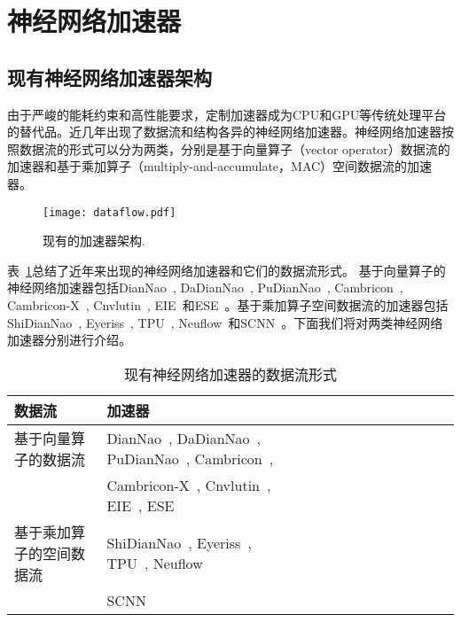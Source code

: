 \section{神经网络加速器}


\subsection{现有神经网络加速器架构}
由于严峻的能耗约束和高性能要求，定制加速器成为CPU和GPU等传统处理平台的替代品。近几年出现了数据流和结构各异的神经网络加速器。神经网络加速器按照数据流的形式可以分为两类，分别是基于向量算子（vector operator）数据流的加速器和基于乘加算子（multiply-and-accumulate，MAC）空间数据流的加速器。
\begin{figure}[h]
  \centering
  \texttt{[image: dataflow.pdf]}
  \caption{\footnotesize 现有的加速器架构.}
  \label{fig:dataflow}
\end{figure}

表~\ref{tab:dataflow}总结了近年来出现的神经网络加速器和它们的数据流形式。
基于向量算子的神经网络加速器包括DianNao~\cite{chen2014diannao}, DaDianNao~\cite{chen2014dadiannao}, PuDianNao~\cite{liu2015pudiannao}, Cambricon~\cite{liu2016cambricon}, Cambricon-X~\cite{zhang2016cambricon}, Cnvlutin~\cite{albericio2016cnvlutin}, EIE~\cite{han2016eie}和ESE~\cite{han2017ese}。基于乘加算子空间数据流的加速器包括ShiDianNao~\cite{du2015shidiannao}, Eyeriss~\cite{chen2017eyeriss}, TPU~\cite{jouppi2017tpu}, Neuflow~\cite{farabet2011neuflow}和SCNN~\cite{angshuman2017scnn}。下面我们将对两类神经网络加速器分别进行介绍。

\begin{table}[h]
  \footnotesize
  \centering
\caption{\footnotesize 现有神经网络加速器的数据流形式}
\label{tab:dataflow}
\begin{tabular}{@{}lllll@{}llllllll}
  \toprule
  数据流 & 加速器\\
  \midrule
  基于向量算子的数据流 & DianNao~\cite{chen2014diannao}, DaDianNao~\cite{chen2014dadiannao}, PuDianNao~\cite{liu2015pudiannao}, Cambricon~\cite{liu2016cambricon}, \\ 
  ~ & Cambricon-X~\cite{zhang2016cambricon}, Cnvlutin~\cite{albericio2016cnvlutin}, EIE~\cite{han2016eie}, ESE~\cite{han2017ese} \\
  基于乘加算子的空间数据流 & ShiDianNao~\cite{du2015shidiannao}, Eyeriss~\cite{chen2017eyeriss}, TPU~\cite{jouppi2017tpu}, Neuflow~\cite{farabet2011neuflow} \\
  ~& SCNN~\cite{angshuman2017scnn}  \\
\bottomrule
\end{tabular}
\end{table}

